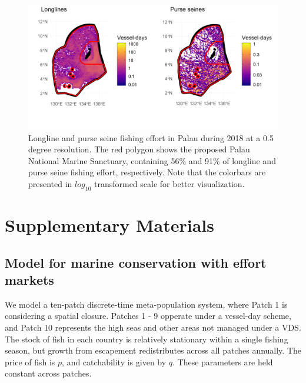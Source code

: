 \documentclass[12pt]{article}
\begin{document}
\begin{figure}
\centering
\includegraphics{img/plw_2018.png}
\caption{\label{fig:plw_2018}Longline and purse seine fishing effort in Palau during 2018 at a 0.5 degree resolution. The red polygon shows the proposed Palau National Marine Sanctuary, containing 56\% and 91\% of longline and purse seine fishing effort, respectively. Note that the colorbars are presented in $log_{10}$ transformed scale for better visualization.}
\end{figure}


\clearpage

\FloatBarrier

\newcommand{\beginsupplement}{\setcounter{table}{0}  \renewcommand{\thetable}{S\arabic{table}} \setcounter{figure}{0} \renewcommand{\thefigure}{S\arabic{figure}}}

\setcounter{table}{0}  \renewcommand{\thetable}{S\arabic{table}} \setcounter{figure}{0} \renewcommand{\thefigure}{S\arabic{figure}}

\section{Supplementary Materials}

\subsection{Model for marine conservation with effort markets}

We model a ten-patch discrete-time meta-population system, where Patch 1 is considering a spatial closure. Patches 1 - 9 opperate under a vessel-day scheme, and Patch 10 represents the high seas and other areas not managed under a VDS. The stock of fish in each country is relatively stationary within a single fishing season, but  growth from escapement redistributes across all patches annually. The price of fish is $p$, and catchability is given by $q$. These parameters are held constant across patches.
\end{document}
